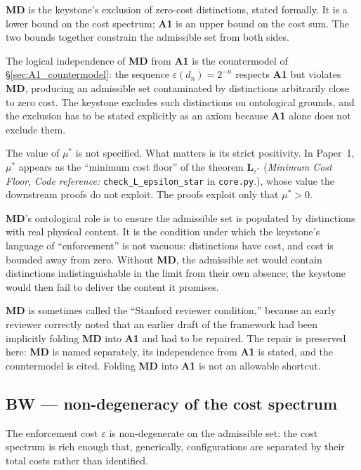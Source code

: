 \documentclass[11pt]{article}
\newcommand{\coderef}[2]{\smallskip\noindent\textit{Code reference:} \texttt{#1} in \texttt{#2}.}
\newcommand{\Aone}{\textbf{A1}}
\begin{document}
\noindent \textbf{MD} is the keystone's exclusion of zero-cost distinctions, stated formally. It is a lower bound on the cost spectrum; \Aone{} is an upper bound on the cost sum. The two bounds together constrain the admissible set from both sides.

The logical independence of \textbf{MD} from \Aone{} is the countermodel of \S\ref{sec:A1_countermodel}: the sequence $\varepsilon(d_n) = 2^{-n}$ respects \Aone{} but violates \textbf{MD}, producing an admissible set contaminated by distinctions arbitrarily close to zero cost. The keystone excludes such distinctions on ontological grounds, and the exclusion has to be stated explicitly as an axiom because \Aone{} alone does not exclude them.

The value of $\mu^*$ is not specified. What matters is its strict positivity. In Paper~1, $\mu^*$ appears as the ``minimum cost floor'' of the theorem \textbf{L}$_{\varepsilon^*}$ (\emph{Minimum Cost Floor}, \coderef{check\_L\_epsilon\_star}{core.py}), whose value the downstream proofs do not exploit. The proofs exploit only that $\mu^* > 0$.

\textbf{MD}'s ontological role is to ensure the admissible set is populated by distinctions with real physical content. It is the condition under which the keystone's language of ``enforcement'' is not vacuous: distinctions have cost, and cost is bounded away from zero. Without \textbf{MD}, the admissible set would contain distinctions indistinguishable in the limit from their own absence; the keystone would then fail to deliver the content it promises.

\textbf{MD} is sometimes called the ``Stanford reviewer condition,'' because an early reviewer correctly noted that an earlier draft of the framework had been implicitly folding \textbf{MD} into \Aone{} and had to be repaired. The repair is preserved here: \textbf{MD} is named separately, its independence from \Aone{} is stated, and the countermodel is cited. Folding \textbf{MD} into \Aone{} is not an allowable shortcut.

\subsection{BW --- non-degeneracy of the cost spectrum}\label{sec:BW}

\begin{tcolorbox}[apfbox, title={Axiom BW --- Boundary Weight (Non-Degeneracy)}]
The enforcement cost $\varepsilon$ is non-degenerate on the admissible set: the cost spectrum is rich enough that, generically, configurations are separated by their total costs rather than identified.
\end{tcolorbox}
\end{document}
